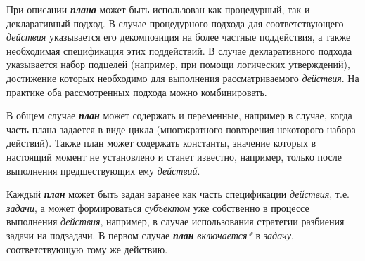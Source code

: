 \begin{SCn}
{При описании \textbf{\textit{плана}} может быть использован как процедурный, так и декларативный подход. В случае процедурного подхода для соответствующего \textit{действия} указывается его декомпозиция на более частные поддействия, а также необходимая спецификация этих поддействий. В случае декларативного подхода указывается набор подцелей (например, при помощи логических утверждений), достижение которых необходимо для выполнения рассматриваемого \textit{действия}. На практике оба рассмотренных подхода можно комбинировать.

В общем случае \textbf{\textit{план}} может содержать и переменные, например в случае, когда часть плана задается в виде цикла (многократного повторения некоторого набора действий). Также план может содержать константы, значение которых в настоящий момент не установлено и станет известно, например, только после выполнения предшествующих ему \textit{действий}.

Каждый \textbf{\textit{план}} может быть задан заранее как часть спецификации \textit{действия}, т.е. \textit{задачи}, а может формироваться \textit{субъектом} уже собственно в процессе выполнения \textit{действия}, например, в случае использования стратегии разбиения задачи на подзадачи. В первом случае \textbf{\textit{план}} \textit{включается*} в \textit{задачу}, соответствующую тому же действию.}

\end{SCn}
